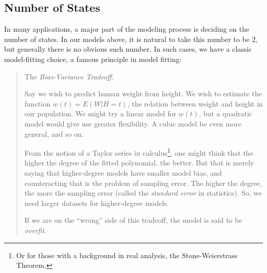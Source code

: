 \documentclass[11pt]{article}
\begin{document}
% 
% 

\subsection{Number of States}

In many applications, a major part of the modeling process is deciding
on the number of states.  In our models above, it is natural to take
this number to be 2, but generally there is no obvious such number.  In
such cases, we have a classic model-fitting choice, a famous principle
in model fitting:

\begin{quote}

The \textit{Bias-Variance Tradeoff}.  

Say we wish to predict human weight from height.  We wish to estimate
the function $w(t) = E(W | H = t)$, the relation between weight and
height in our population.  We might try a linear model for $w(t)$, but a
quadratic model would give use greater flexibility.  A cubic model be
even more general, and so on.

From the notion of a Taylor series in calculus\footnote{Or for those
with a background in real analysis, the Stone-Weierstrass Theorem.},
one might think that the higher the degree of the fitted polynomial, the
better.  But that is merely saying that higher-degree models have
smaller model bias, and counteracting that is the problem of sampling
error.  The higher the degree, the more the sampling error (called the
\textit{standard error} in statistics).  So, we need larger datasets
for higher-degree models.

If we are on the ``wrong'' side of this tradeoff, the model is said to
be \textit{overfit}.

\end{quote}
\end{document}
